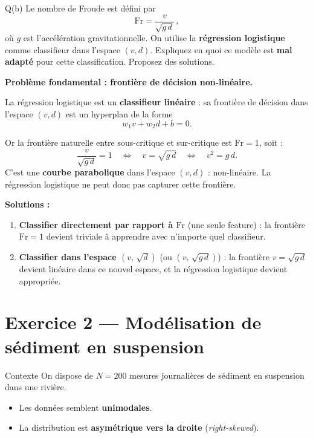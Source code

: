 \documentclass[12pt,a4paper]{article}
\begin{document}
\begin{enonce}{Q(b)}
Le nombre de Froude est défini par
\[
  \mathrm{Fr} = \frac{v}{\sqrt{g\,d}}\,,
\]
où $g$ est l'accélération gravitationnelle.
On utilise la \textbf{régression logistique} comme classifieur dans l'espace $(v, d)$.
Expliquez en quoi ce modèle est \textbf{mal adapté} pour cette classification.
Proposez des solutions.
\end{enonce}

\begin{solution}

\textbf{Problème fondamental : frontière de décision non-linéaire.}

La régression logistique est un \textbf{classifieur linéaire} : sa frontière de décision
dans l'espace $(v, d)$ est un hyperplan de la forme
\[
  w_1 v + w_2 d + b = 0.
\]

Or la frontière naturelle entre sous-critique et sur-critique est $\mathrm{Fr} = 1$, soit :
\[
  \frac{v}{\sqrt{g\,d}} = 1
  \quad\Longleftrightarrow\quad
  v = \sqrt{g\,d}
  \quad\Longleftrightarrow\quad
  v^2 = g\,d.
\]
C'est une \textbf{courbe parabolique} dans l'espace $(v, d)$ : non-linéaire.
La régression logistique ne peut donc pas capturer cette frontière.

\medskip
\textbf{Solutions :}

\begin{enumerate}[label=\textbf{--},itemsep=4pt]
  \item \textbf{Classifier directement par rapport à $\mathrm{Fr}$} (une seule feature) :
  la frontière $\mathrm{Fr} = 1$ devient triviale à apprendre avec n'importe quel classifieur.

  \item \textbf{Classifier dans l'espace $(v,\,\sqrt{d})$} (ou $(v,\,\sqrt{g\,d})$) :
  la frontière $v = \sqrt{g\,d}$ devient linéaire dans ce nouvel espace,
  et la régression logistique devient appropriée.
\end{enumerate}
\end{solution}

\section{Exercice 2 — Modélisation de sédiment en suspension}

\begin{enonce}{Contexte}
On dispose de $N = 200$ mesures journalières de sédiment en suspension dans une rivière.
\begin{itemize}[itemsep=2pt]
  \item Les données semblent \textbf{unimodales}.
  \item La distribution est \textbf{asymétrique vers la droite} (\emph{right-skewed}).
\end{itemize}
\end{enonce}
\end{document}
